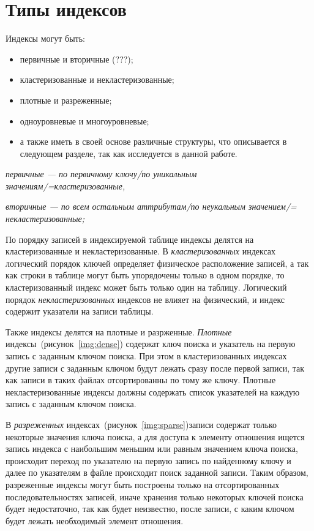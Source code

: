 \section{Типы индексов}

Индексы могут быть:
\begin{itemize}
    \item первичные и вторичные (???);
    \item кластеризованные и некластеризованные;
    \item плотные и разреженные;
    \item одноуровневые и многоуровневые;
    \item а также иметь в своей основе различные структуры, что описывается в
        следующем разделе, так как исследуется в данной работе.
\end{itemize}

\textit{ первичные --- по первичному ключу/по уникальным
значениям/=кластеризованные,}

\textit{вторичные --- по всем остальным аттрибутам/по неукальным значением/=
некластеризованные;}

По порядку записей в индексируемой таблице индексы делятся на кластеризованные и
некластеризованные.  В \textit{кластеризованных} индексах логический порядок
ключей определяет физическое расположение записей, а так как строки в таблице
могут быть упорядочены только в одном порядке, то кластеризованный индекс может
быть только один на таблицу. Логический порядок \textit{некластеризованных}
индексов не влияет на физический, и индекс содержит указатели на записи
таблицы.

Также индексы делятся на плотные и разрженные. \textit{Плотные}
индексы~(рисунок~\ref{img:dense}) содержат ключ поиска и указатель на первую
запись с заданным ключом поиска. При этом в кластеризованных индексах другие
записи с заданным ключом будут лежать сразу после первой записи, так как записи
в таких файлах отсортированны по тому же ключу.  Плотные некластеризованные
индексы должны содержать список указателей на каждую запись с заданным ключом
поиска.
 

В \textit{разреженных} индексах~(рисунок~\ref{img:sparse})записи содержат только
некоторые значения ключа поиска, а для доступа к элементу отношения ищется
запись индекса с наибольшим меньшим или равным значением ключа поиска,
происходит переход по указателю на первую запись по найденному ключу и далее по
указателям в файле происходит поиск заданной записи. Таким образом, разреженные
индексы могут быть построены только на отсортированных последовательностях
записей, иначе хранения только некоторых ключей поиска будет недостаточно, так
как будет неизвестно, после записи, с каким ключом будет лежать необходимый
элемент отношения.

